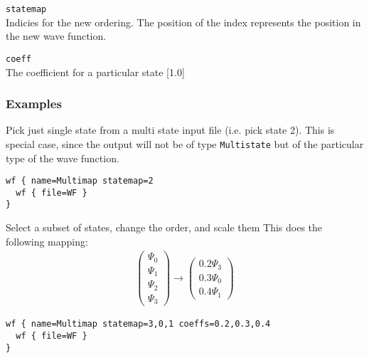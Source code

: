 \documentclass[a4paper,12pt]{scrbook}
\newcommand{\option}[2]{\item \texttt{#1}\\ #2}
\begin{document}
\begin{options}
 \option{statemap}{Indicies for the new ordering. The position of the index represents the position in the new wave function.}
 \option{coeff}{The coefficient for a particular state [1.0]}
\end{options}

\subsubsection*{Examples}
Pick just single state from a multi state input file (i.e. pick state 2). This is special case, since
the output will not be of type \verb|Multistate| but of the particular type of the wave function.
\begin{verbatim}
wf { name=Multimap statemap=2
  wf { file=WF }
}
\end{verbatim}

Select a  subset of states, change the order, and scale them This does the following mapping:
\begin{align}
\begin{pmatrix}
\Psi_0 \\ \Psi_1 \\ \Psi_2 \\ \Psi_3
\end{pmatrix}
\rightarrow
\begin{pmatrix}
0.2 \Psi_3 \\ 0.3 \Psi_0 \\ 0.4\Psi_1
\end{pmatrix}
\nonumber
\end{align}
\begin{verbatim}
wf { name=Multimap statemap=3,0,1 coeffs=0.2,0.3,0.4
  wf { file=WF }
}
\end{verbatim}




\end{document}
